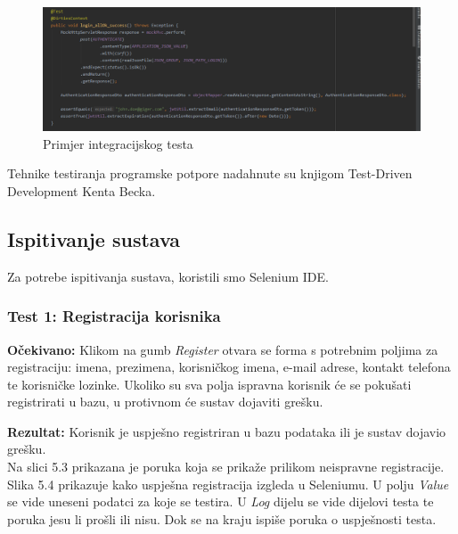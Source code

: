 			\begin{figure}[H]
				\begin{center}
					\includegraphics[width=17cm]{slike/integracijski_test.PNG}
				\end{center}
				\caption{Primjer integracijskog testa}
				\label{fig:inttest}
			\end{figure}
			
			Tehnike testiranja programske potpore nadahnute su knjigom Test-Driven Development Kenta Becka.
			
			
			
			\subsection{Ispitivanje sustava}
			
			 
		 	Za potrebe ispitivanja sustava, koristili smo Selenium IDE.
		 	
		 	\subsubsection{Test 1: Registracija korisnika}
		 		
		 		\textbf{Očekivano:} Klikom na gumb \textit{Register} otvara se forma s potrebnim poljima za registraciju: imena, prezimena, korisničkog imena, e-mail adrese, kontakt telefona te korisničke lozinke. Ukoliko su sva polja ispravna korisnik će se pokušati registrirati u bazu, u protivnom će sustav dojaviti grešku.
		 		
		 		
		 		\noindent\textbf{Rezultat:} Korisnik je uspješno registriran u bazu podataka ili je sustav dojavio grešku.\\
		 		
		 		
		 		Na slici 5.3 prikazana je poruka koja se prikaže prilikom neispravne registracije. Slika 5.4 prikazuje kako uspješna registracija izgleda u Seleniumu. U polju \textit{Value} se vide uneseni podatci za koje se testira. U \textit{Log} dijelu se vide dijelovi testa te poruka jesu li prošli ili nisu. Dok se na kraju ispiše poruka o uspješnosti testa.  
		 		

